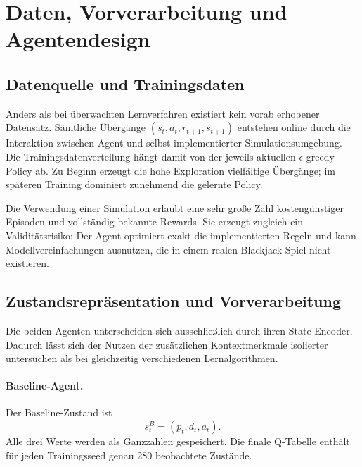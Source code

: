 \section{Daten, Vorverarbeitung und Agentendesign}
\label{sec:agenten_design}

\subsection{Datenquelle und Trainingsdaten}

Anders als bei überwachten Lernverfahren existiert kein vorab
erhobener Datensatz. Sämtliche Übergänge $(s_t,a_t,r_{t+1},s_{t+1})$
entstehen online durch die Interaktion zwischen Agent und selbst
implementierter Simulationsumgebung. Die Trainingsdatenverteilung
hängt damit von der jeweils aktuellen $\epsilon$-greedy Policy ab. Zu
Beginn erzeugt die hohe Exploration vielfältige Übergänge; im
späteren Training dominiert zunehmend die gelernte Policy.

Die Verwendung einer Simulation erlaubt eine sehr große Zahl
kostengünstiger Episoden und vollständig bekannte Rewards. Sie
erzeugt zugleich ein Validitätsrisiko: Der Agent optimiert exakt die
implementierten Regeln und kann Modellvereinfachungen ausnutzen, die
in einem realen Blackjack-Spiel nicht existieren.

\subsection{Zustandsrepräsentation und Vorverarbeitung}

Die beiden Agenten unterscheiden sich ausschließlich durch ihren
State Encoder. Dadurch lässt sich der Nutzen der zusätzlichen
Kontextmerkmale isolierter untersuchen als bei gleichzeitig
verschiedenen Lernalgorithmen.

\paragraph{Baseline-Agent.}
Der Baseline-Zustand ist
\begin{equation}
  s_t^{B}=(p_t,d_t,a_t).
\end{equation}
Alle drei Werte werden als Ganzzahlen gespeichert. Die finale
Q-Tabelle enthält für jeden Trainingsseed genau 280 beobachtete Zustände.

